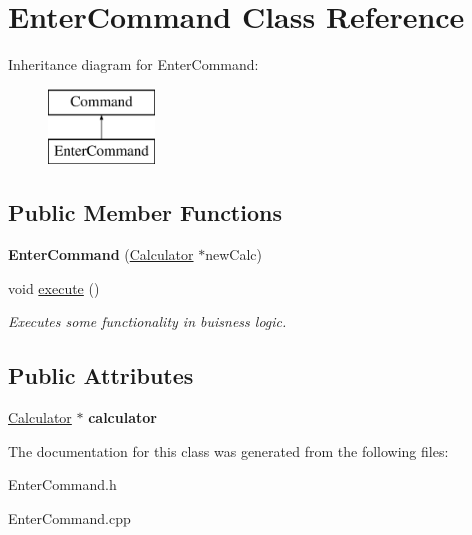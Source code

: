 \hypertarget{class_enter_command}{}\section{Enter\+Command Class Reference}
\label{class_enter_command}
Inheritance diagram for Enter\+Command\+:\begin{figure}[H]
\begin{center}
\leavevmode
\includegraphics[height=2.000000cm]{class_enter_command}
\end{center}
\end{figure}
\subsection*{Public Member Functions}
\begin{DoxyCompactItemize}
\item 
\hypertarget{class_enter_command_aa582c411b3919835a7ff06ec5f089a66}{}{\bfseries Enter\+Command} (\hyperlink{class_calculator}{Calculator} $\ast$new\+Calc)\label{class_enter_command_aa582c411b3919835a7ff06ec5f089a66}

\item 
\hypertarget{class_enter_command_ae8701c3ea3682f566dfbcd3415a767f8}{}void \hyperlink{class_enter_command_ae8701c3ea3682f566dfbcd3415a767f8}{execute} ()\label{class_enter_command_ae8701c3ea3682f566dfbcd3415a767f8}

\begin{DoxyCompactList}\small\item\em Executes some functionality in buisness logic. \end{DoxyCompactList}\end{DoxyCompactItemize}
\subsection*{Public Attributes}
\begin{DoxyCompactItemize}
\item 
\hypertarget{class_enter_command_a565ba3ebfd7b06dcd5fd30baa806f798}{}\hyperlink{class_calculator}{Calculator} $\ast$ {\bfseries calculator}\label{class_enter_command_a565ba3ebfd7b06dcd5fd30baa806f798}

\end{DoxyCompactItemize}


The documentation for this class was generated from the following files\+:\begin{DoxyCompactItemize}
\item 
Enter\+Command.\+h\item 
Enter\+Command.\+cpp\end{DoxyCompactItemize}
